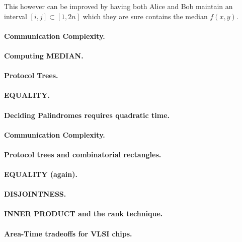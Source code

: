 \documentclass[11pt,a4paper]{article}
\theoremstyle{definition}
\begin{document}
This however can be improved by having both Alice and Bob maintain an interval $[i,j] \subset [1,2n]$ which they are sure contains the median $f(x,y)$.

\paragraph{Communication Complexity.}

\paragraph{Computing MEDIAN.}

\paragraph{Protocol Trees.}

\paragraph{EQUALITY.}

\paragraph{Deciding Palindromes requires quadratic time.}

\paragraph{Communication Complexity.}

\paragraph{Protocol trees and combinatorial rectangles.}

\paragraph{EQUALITY (again).}

\paragraph{DISJOINTNESS.}

\paragraph{INNER PRODUCT and the rank technique.}

\paragraph{Area-Time tradeoffs for VLSI chips.}
\end{document}
